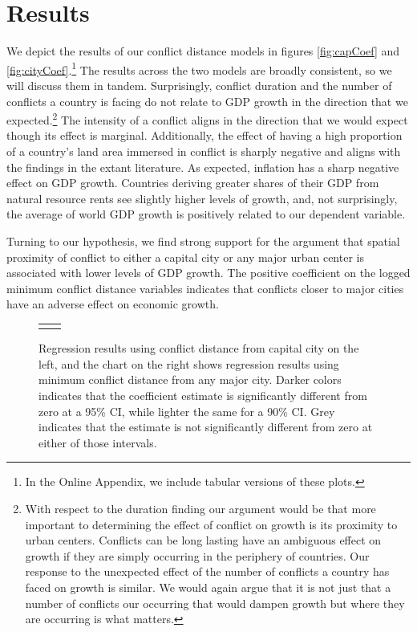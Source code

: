 \section{Results}
\label{findings} 

We depict the results of our conflict distance models in figures \ref{fig:capCoef} and \ref{fig:cityCoef}.\footnote{In the Online Appendix, we include tabular versions of these plots.} The results across the two models are broadly consistent, so we will discuss them in tandem. Surprisingly, conflict duration and the number of conflicts a country is facing do not relate to GDP growth in the direction that we expected.\footnote{With respect to the duration finding our argument would be that more important to determining the effect of conflict on growth is its proximity to urban centers. Conflicts can be long lasting have an ambiguous effect on growth if they are simply occurring in the periphery of countries. Our response to the unexpected effect of the number of conflicts a country has faced on growth is similar. We would again argue that it is not just that a number of conflicts our occurring that would dampen growth but where they are occurring is what matters.} The intensity of a conflict aligns in the direction that we would expect though its effect is marginal. Additionally, the effect of having a high proportion of a country's land area immersed in conflict is sharply negative and aligns with the findings in the extant literature. As expected, inflation has a sharp negative effect on GDP growth. Countries deriving greater shares of their GDP from natural resource rents see slightly higher levels of growth, and, not surprisingly, the average of world GDP growth is positively related to our dependent variable.

Turning to our hypothesis, we find strong support for the argument that spatial proximity of conflict to either a capital city or any major urban center is associated with lower levels of GDP growth. The positive coefficient on the logged minimum conflict distance variables indicates that conflicts closer to major cities have an adverse effect on economic growth. 

\begin{figure}
	\centering
	\begin{tabular}{cc}
		\subfloat[SubFigure 1][Capital City]{
			\resizebox{.45\textwidth}{!}{}
		\label{fig:capCoef}} &
		\subfloat[SubFigure 2][Any Major City]{
			\resizebox{.45\textwidth}{!}{}
		\label{fig:cityCoef}}
	\end{tabular}
	\caption{Regression results using conflict distance from capital city on the left, and the chart on the right shows regression results using minimum conflict distance from any major city. Darker colors indicates that the coefficient estimate is significantly different from zero at a 95\% CI, while lighter the same for a 90\% CI. Grey indicates that the estimate is not significantly different from zero at either of those intervals.}
	\label{fig:coefplot}
\end{figure}

